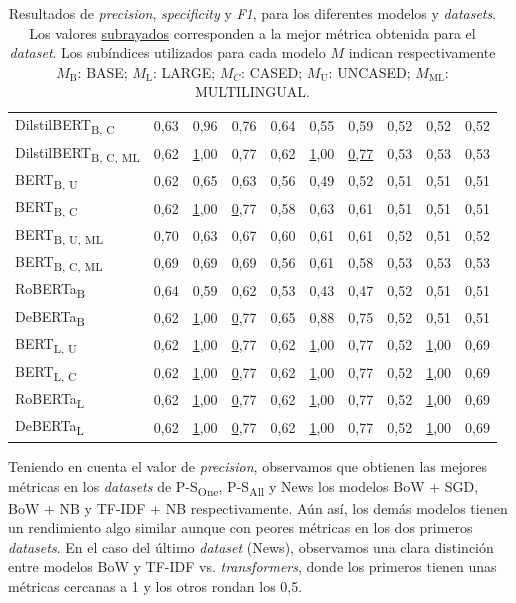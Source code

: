 \begin{table}[!h]
\begin{center}
\begin{tabular}{lccccccccc}
        {DilstilBERT}\textsubscript{B, C} & 0,63 & 0,96 & 0,76 & 0,64 & 0,55 & 0,59 & 0,52 & 0,52 & 0,52 \\
        {DilstilBERT}\textsubscript{B, C, ML} & 0,62 & {\ul 1,00} & 0,77 & 0,62 & {\ul 1,00} & \underline{0,77} & 0,53 & 0,53 & 0,53 \\ \hline
        {BERT}\textsubscript{B, U} & 0,62 & 0,65 & 0,63 & 0,56 & 0,49 & 0,52 & 0,51 & 0,51 & 0,51 \\
        {BERT}\textsubscript{B, C} & 0,62 & {\ul 1,00} & {\ul 0,77} & 0,58 & 0,63 & 0,61 & 0,51 & 0,51 & 0,51 \\
        {BERT}\textsubscript{B, U, ML} & 0,70 & 0,63 & 0,67 & 0,60 & 0,61 & 0,61 & 0,52 & 0,51 & 0,52 \\
        {BERT}\textsubscript{B, C, ML} & 0,69 & 0,69 & 0,69 & 0,56 & 0,61 & 0,58 & 0,53 & 0,53 & 0,53 \\ \hline
        {RoBERTa}\textsubscript{B} & 0,64 & 0,59 & 0,62 & 0,53 & 0,43 & 0,47 & 0,52 & 0,51 & 0,51 \\ \hline
        {DeBERTa}\textsubscript{B} & 0,62 & {\ul 1,00} & {\ul 0,77} & 0,65 & 0,88 & 0,75 & 0,52 & 0,51 & 0,51 \\ \hline
        {BERT}\textsubscript{L, U} & 0,62 & {\ul 1,00} & {\ul 0,77} & 0,62 & {\ul 1,00} & 0,77 & 0,52 & {\ul 1,00} & 0,69 \\
        {BERT}\textsubscript{L, C} & 0,62 & {\ul 1,00} & {\ul 0,77} & 0,62 & {\ul 1,00} & 0,77 & 0,52 & {\ul 1,00} & 0,69 \\ \hline
        {RoBERTa}\textsubscript{L} & 0,62 & {\ul 1,00} & {\ul 0,77} & 0,62 & {\ul 1,00} & 0,77 & 0,52 & {\ul 1,00} & 0,69 \\ \hline
        {DeBERTa}\textsubscript{L} & 0,62 & {\ul 1,00} & {\ul 0,77} & 0,62 & {\ul 1,00} & 0,77 & 0,52 & {\ul 1,00} & 0,69 \\ \hline
    \end{tabular}
    \end{center}
    \caption{Resultados de \textit{precision}, \textit{specificity} y \textit{F1},  para los diferentes modelos y \textit{datasets}. Los valores \underline{subrayados} corresponden a la mejor métrica obtenida para el \textit{dataset}. Los subíndices utilizados para cada modelo $M$ indican respectivamente $M_{\text{B}}$: BASE; $M_{\text{L}}$: LARGE; $M_{C}$: CASED; $M_{\text{U}}$: UNCASED; $M_{\text{ML}}$: MULTILINGUAL.}
    \label{tab:other-metrics}
\end{table}


Teniendo en cuenta el valor de \textit{precision}, observamos que obtienen las mejores métricas en los \textit{datasets} de {P-S}\textsubscript{One}, {P-S}\textsubscript{All} y News los modelos BoW + SGD, BoW + NB y \linebreak TF-IDF + NB respectivamente. Aún así, los demás modelos tienen un rendimiento algo similar aunque con peores métricas en los dos primeros \textit{datasets}. En el caso del último \textit{dataset} (News), observamos una clara distinción entre modelos BoW y TF-IDF vs. \textit{transformers}, donde los primeros tienen unas métricas cercanas a 1 y los otros rondan los 0,5.

